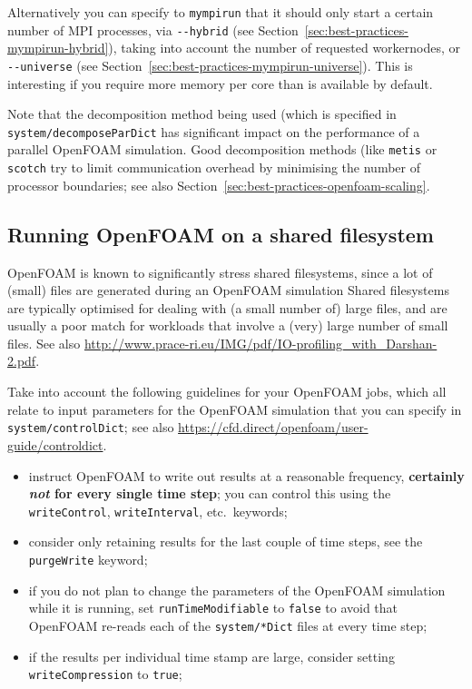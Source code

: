 Alternatively you can specify to \texttt{mympirun} that it should only start a certain number of MPI processes,
via {\small\texttt{-{}-hybrid}} (see Section~\ref{sec:best-practices-mympirun-hybrid}),
taking into account the number of requested workernodes,
or {\small\texttt{-{}-universe}} (see Section~\ref{sec:best-practices-mympirun-universe}).
This is interesting if you require more memory per core than is available by default.

Note that the decomposition method being used (which is specified in {\small\texttt{system/decomposeParDict}}
has significant impact on the performance of a parallel OpenFOAM simulation. Good decomposition methods (like
{\small\texttt{metis}} or {\small\texttt{scotch}} try to limit communication overhead by minimising the number
of processor boundaries; see also Section~\ref{sec:best-practices-openfoam-scaling}.


\subsection{Running OpenFOAM on a shared filesystem}
\label{sec:best-practices-openfoam-shared-filesystems}

OpenFOAM is known to significantly stress shared filesystems, since a lot of (small) files are generated
during an OpenFOAM simulation Shared filesystems are typically optimised for dealing with (a small number of)
large files, and are usually a poor match for workloads that involve a (very) large number of small files.
See also {\small\url{http://www.prace-ri.eu/IMG/pdf/IO-profiling_with_Darshan-2.pdf}}.

Take into account the following guidelines for your OpenFOAM jobs, which all relate to input parameters
for the OpenFOAM simulation that you can specify in \texttt{\small{system/controlDict}};
see also {\small\url{https://cfd.direct/openfoam/user-guide/controldict}}.

\begin{itemize}
\item instruct OpenFOAM to write out results at a reasonable frequency, \textbf{certainly \textit{not}
for every single time step}; you can control this using the \texttt{\small{writeControl}},
\texttt{\small{writeInterval}}, etc.\ keywords;
\item consider only retaining results for the last couple of time steps, see the \texttt{\small{purgeWrite}} keyword;
\item if you do not plan to change the parameters of the OpenFOAM simulation while it is running,
      set \texttt{\small{runTimeModifiable}} to \texttt{\small{false}} to avoid that OpenFOAM re-reads each of
      the \texttt{\small{system/*Dict}} files at every time step;
\item if the results per individual time stamp are large, consider setting \texttt{\small{writeCompression}} to
      \texttt{\small{true}};
\end{itemize}

